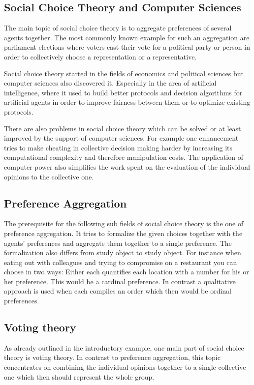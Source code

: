 \documentclass[a4paper]{paper}
\begin{document}
\subsection{Social Choice Theory and Computer Sciences}
The main topic of social choice theory is to aggregate preferences of several agents together. The most commonly known example for such an aggregation are parliament elections where voters cast their vote for a political party or person in order to collectively choose a representation or a representative.

Social choice theory started in the fields of economics and political sciences but computer sciences also discovered it. Especially in the area of artificial intelligence, where it used to build better protocols and decision algorithms for artificial agents in order to improve fairness between them or to optimize existing protocols. 

There are also problems in social choice theory which can be solved or at least improved by the support of computer sciences. For example one enhancement tries to make cheating in collective decision making harder by increasing its computational complexity and therefore manipulation costs. The application of computer power also simplifies the work spent on the evaluation of the individual opinions to the collective one.

\subsection{Preference Aggregation}

The prerequisite for the following sub fields of social choice theory is the one of preference aggregation. It tries to formalize the given choices together with the agents' preferences and aggregate them together to a single preference. The formalization also differs from study object to study object. For instance when eating out with colleagues and trying to compromise on a restaurant you can choose in two ways: Either each quantifies each location with a number for his or her preference. This would be a cardinal preference. In contrast a qualitative approach is used when each compiles an order which then would be ordinal preferences.~\cite[Chapter~2]{BCE12}

\subsection{Voting theory}

As already outlined in the introductory example, one main part of social choice theory is voting theory. In contrast to preference aggregation, this topic concentrates on combining the individual opinions together to a single collective one which then should represent the whole group.
\end{document}
